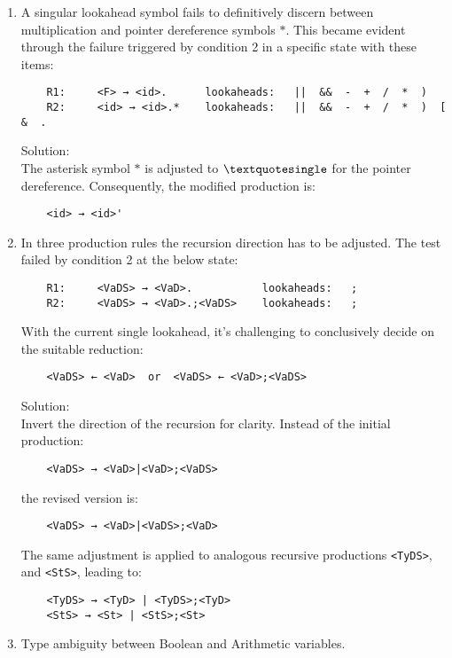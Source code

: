 \begin{enumerate}
    \item A singular lookahead symbol fails to definitively discern between multiplication and pointer dereference symbols \(\ast\). This became evident through the failure triggered by condition 2 in a specific state with these items:
    \begin{verbatim}
    R1:     <F> → <id>.      lookaheads:   ||  &&  -  +  /  *  )
    R2:     <id> → <id>.*    lookaheads:   ||  &&  -  +  /  *  )  [  &  .
    \end{verbatim}
    Solution: \\
    The asterisk symbol \(\ast\) is adjusted to \(\textquotesingle\) for the pointer dereference. Consequently, the modified production is:
    \begin{verbatim}
    <id> → <id>'
    \end{verbatim}

    \item In three production rules the recursion direction has to be adjusted.
    The test failed by condition 2 at the below state:
    \begin{verbatim}
    R1:     <VaDS> → <VaD>.           lookaheads:   ;
    R2:     <VaDS> → <VaD>.;<VaDS>    lookaheads:   ;
    \end{verbatim}
    With the current single lookahead, it’s challenging to conclusively decide on the suitable reduction:
    \begin{verbatim}
    <VaDS> ← <VaD>  or  <VaDS> ← <VaD>;<VaDS>
    \end{verbatim}

    Solution: \\
    Invert the direction of the recursion for clarity. Instead of the initial production:
    \begin{verbatim}
    <VaDS> → <VaD>|<VaD>;<VaDS>
    \end{verbatim}
    the revised version is:
    \begin{verbatim}
    <VaDS> → <VaD>|<VaDS>;<VaD>
    \end{verbatim}

    The same adjustment is applied to analogous recursive productions \texttt{<TyDS>}, and \texttt{<StS>}, leading to:
    \begin{verbatim}
    <TyDS> → <TyD> | <TyDS>;<TyD>
    <StS> → <St> | <StS>;<St>
    \end{verbatim}

    \item Type ambiguity between Boolean and Arithmetic variables.


\end{enumerate}
